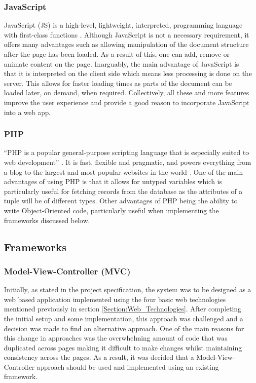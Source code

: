 \subsubsection{JavaScript}
JavaScript (JS) is a high-level, lightweight, interpreted, programming language with first-class functions \cite{Mozilla:JavaScript}. Although JavaScript is not a necessary requirement, it offers many advantages such as allowing manipulation of the document structure after the page has been loaded. As a result of this, one can add, remove or animate content on the page. Inarguably, the main advantage of JavaScript is that it is interpreted on the client side which means less processing is done on the server. This allows for faster loading times as parts of the document can be loaded later, on demand, when required. Collectively, all these and more features improve the user experience and provide a good reason to incorporate JavaScript into a web app.

\subsubsection{PHP} 
``PHP is a popular general-purpose scripting language that is especially suited to web development'' \cite{PHP:Home}. It is fast, flexible and pragmatic, and powers everything from a blog to the largest and most popular websites in the world \cite{PHP:Home}. One of the main advantages of using PHP is that it allows for untyped variables which is particularly useful for fetching records from the database as the attributes of a tuple will be of different types. Other advantages of PHP being the ability to write Object-Oriented code, particularly useful when implementing the frameworks discussed below.

\subsection{Frameworks}

\subsubsection{Model-View-Controller (MVC)}
Initially, as stated in the project specification, the system was to be designed as a web based application implemented using the four basic web technologies mentioned previously in section \ref{Section:Web_Technologies}. After completing the initial setup and some implementation, this approach was challenged and a decision was made to find an alternative approach. One of the main reasons for this change in approaches was the overwhelming amount of code that was duplicated across pages making it difficult to make changes whilst maintaining consistency across the pages. As a result, it was decided that a Model-View-Controller approach should be used and implemented using an existing framework.

